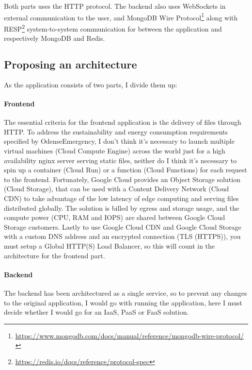 \documentclass[11pt]{article}
\begin{document}
\vspace{.25cm}

Both parts uses the HTTP protocol. The backend also uses WebSockets in external communication to the user, and MongoDB Wire Protocol\footnote{\href{https://www.mongodb.com/docs/manual/reference/mongodb-wire-protocol/}{https://www.mongodb.com/docs/manual/reference/mongodb-wire-protocol/}} along with RESP\footnote{\href{https://redis.io/docs/reference/protocol-spec}{https://redis.io/docs/reference/protocol-spec}} system-to-system communication for between the application and respectively MongoDB and Redis.

\subsection{Proposing an architecture}
As the application consists of two parts, I divide them up:

\paragraph{Frontend}
The essential criteria for the frontend application is the delivery of files through HTTP. To address the sustainability and energy consumption requirements specified by OdenseEmergency, I don't think it's necessary to launch multiple virtual machines (Cloud Compute Engine) across the world just for a high availability nginx server serving static files, neither do I think it's necessary to spin up a container (Cloud Run) or a function (Cloud Functions) for each request to the frontend. Fortunately, Google Cloud provides an Object Storage solution (Cloud Storage), that can be used with a Content Delivery Network (Cloud CDN) to take advantage of the low latency of edge computing and serving files distributed globally. The solution is billed by egress and storage usage, and the compute power (CPU, RAM and IOPS) are shared between Google Cloud Storage customers. Lastly to use Google Cloud CDN and Google Cloud Storage with a custom DNS address and an encrypted connection (TLS (HTTPS)), you must setup a Global HTTP(S) Load Balancer, so this will count in the architecture for the frontend part.

\paragraph{Backend}
The backend has been architectured as a single service, so to prevent any changes to the original application, I would go with running the application, here I must decide whether I would go for an IaaS, PaaS or FaaS solution. 
\end{document}
